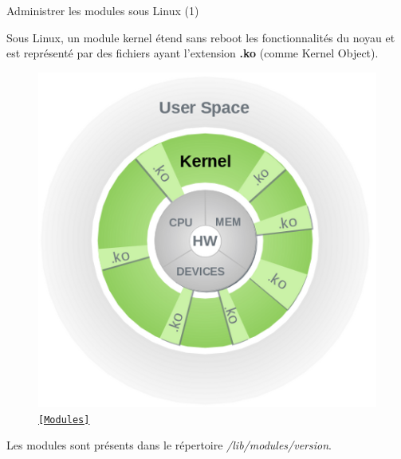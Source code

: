 \documentclass[12pt, t]{beamer}
\newcommand{\src}[2]{\vspace{-10pt}\caption{\href{#1}{\centering \tt \tiny [#2]}}}
\begin{document}
\begin{frame}{Administrer les modules sous Linux (1)}

    \vspace{3pt}
    Sous Linux, un module kernel étend sans reboot les fonctionnalités du noyau
    et est représenté par des fichiers ayant l'extension {\textbf{.ko}} (comme
    Kernel Object).

    \begin{figure}
        \centering
        \includegraphics[scale=0.6]{modules.png}
        \src{https://drivers.suse.com/doc/SolidDriver/Kernel_Modules.html}{Modules}
    \end{figure}

    {
        \vspace{-14pt}
        Les modules sont présents dans le répertoire
        {\textit{/lib/modules/version}}.
    }

\end{frame}

\end{document}

